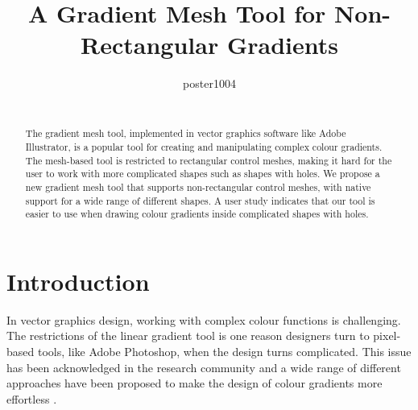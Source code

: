 \documentclass{egpubl}
\title[Non-rectangular gradient mesh tool]
{A Gradient Mesh Tool for Non-Rectangular Gradients}
\author[poster1004]
{\parbox{\textwidth}{\centering poster1004}
	\\
	{\parbox{\textwidth}{\centering } }
}
\begin{document}
	
	
	\maketitle
	
	\begin{abstract}
		The gradient mesh tool, implemented in vector graphics software like Adobe Illustrator, is a popular tool for creating and manipulating complex colour gradients. The mesh-based tool is restricted to rectangular control meshes, making it hard for the user to work with more complicated shapes such as shapes with holes. We propose a new gradient mesh tool that supports non-rectangular control meshes, with native support for a wide range of different shapes. A user study indicates that our tool is easier to use when drawing colour gradients inside complicated shapes with holes.
		
		\begin{classification} %
		\end{classification}
		
	\end{abstract}
	
	\section{Introduction}
	\label{sec:intro}
	
	In vector graphics design, working with complex colour functions is challenging. The restrictions of the linear gradient tool is one reason designers turn to pixel-based tools, like Adobe Photoshop, when the design turns complicated. This issue has been acknowledged in the research community and a wide range of different approaches have been proposed to make the design of colour gradients more effortless \cite{Orzan:2008,Lopez-Moreno:2013, Vergne:2012, Shao:2012}.
	
\end{document}
